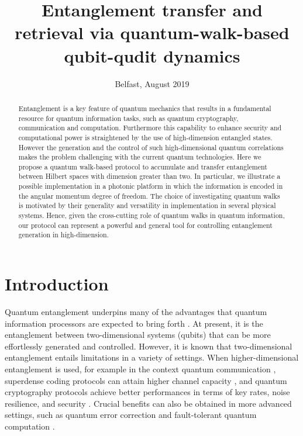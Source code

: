 \documentclass[
	aps, pra,
	superscriptaddress, twocolumn,
	floatfix,
	10pt
]{revtex4-1}
\newcommand{\parTitle}[1]{\noindent{\color{Mahogany}(\emph{#1})}}
\begin{document}
\title{Entanglement transfer and retrieval via quantum-walk-based qubit-qudit dynamics}
\author{Belfast, August 2019}

\begin{abstract}
Entanglement is a key feature of quantum mechanics that results in a fundamental resource for quantum information tasks, such as quantum cryptography, communication and computation. Furthermore this capability to enhance security and computational power is straightened by the use of high-dimension entangled states. However the generation and the control of such high-dimensional quantum correlations makes the problem  challenging with the current quantum technologies.  Here we propose a quantum walk-based protocol to accumulate and transfer entanglement between Hilbert spaces with dimension greater than two. In particular, we illustrate a possible implementation in a photonic platform in which the information is encoded in the angular momentum degree of freedom. The choice of investigating quantum walks is motivated by their generality and versatility in implementation in several physical systems. Hence, given the cross-cutting role of quantum walks in quantum information, our protocol can represent  a  powerful and general tool for controlling entanglement generation in high-dimension.
\end{abstract}
\maketitle


\section{Introduction}

\parTitle{High-dimensional entanglement is relevant}
Quantum entanglement underpins many of the advantages that quantum information processors are expected to bring forth \cite{horodecki2009quantum}. At present, it is the entanglement between two-dimensional systems (qubits) that can be more effortlessly generated and controlled. However, it is known that two-dimensional entanglement entails limitations in a variety of settings. When higher-dimensional entanglement is used, for example in the context quantum communication \cite{cozzolino2019high}, superdense coding protocols can attain higher channel capacity \cite{liu2002general, grudka2002symmetric, hu2018beating}, and quantum cryptography protocols achieve better performances in terms of key rates, noise resilience, and security \cite{bechmannpasquinucci2000quantum, cerf2002security, Bruss2002, Karimipour2002, acin2003security, karimipour2002quantum,  durt2004security, groblacher2006experimental, huber2013weak, nunn2013largealphabet, mower2013highdimensional, lee2014entanglementbased, zhong2015photonefficient, Mirhosseini_2015}. Crucial benefits can also be obtained in more advanced settings, such as quantum error correction \cite{Chuang1997, Campbell2012, Duclos-Cianci2013, Michael2016} and fault-tolerant quantum computation \cite{bartlett2002quantum,ralph2007efficient, Lanyon2009, Campbell2014}.
\end{document}
